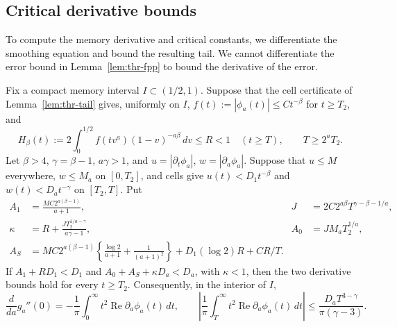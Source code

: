 \subsection{Critical derivative bounds}
\label{or:transition-unique}

To compute the memory derivative and critical constants, we
differentiate the smoothing equation and bound the resulting tail.
We cannot differentiate the error bound in Lemma~\ref{lem:thr-fpp}
to bound the derivative of the error.

\begin{lemma}\label{lem:thr-parameter-tail}
Fix a compact memory interval $I\subset(1/2,1)$. Suppose that the
cell certificate of Lemma~\ref{lem:thr-tail} gives, uniformly on $I$,
$f(t):=|\phi_a(t)|\le Ct^{-\beta}$ for $t\ge T_2$, and
\[
 H_\beta(t):=2\int_0^{1/2}f(tv^a)(1-v)^{-a\beta}\,dv\le R<1
 \quad(t\ge T),\qquad T\ge2^aT_2.
\]
Let $\beta>4$, $\gamma=\beta-1$, $a\gamma>1$, and
$u=|\partial_t\phi_a|$, $w=|\partial_a\phi_a|$.
Suppose that $u\le M$ everywhere, $w\le M_a$ on $[0,T_2]$, and
cells give $u(t)<D_1t^{-\beta}$ and $w(t)<D_at^{-\gamma}$ on $[T_2,T]$.
Put
\begin{align*}
 A_1&=\frac{MC2^{a(\beta-1)}}{a+1},&
 J&=2C2^{a\beta}T^{\gamma-\beta-1/a},\\
 \kappa&=R+\frac{JT_2^{1/a-\gamma}}{a\gamma-1},&
 A_0&=JM_aT_2^{1/a},\\
 A_S&=MC2^{a(\beta-1)}
 \left\{\frac{\log2}{a+1}+\frac1{(a+1)^2}\right\}
       +D_1(\log2)R+CR/T.
\end{align*}
If $A_1+RD_1<D_1$ and $A_0+A_S+\kappa D_a<D_a$, with
$\kappa<1$, then the two derivative bounds hold for every $t\ge T_2$.
Consequently, in the interior of $I$,
\begin{equation}\label{eq:thr-memory-derivative}
 \frac{d}{da}g_a''(0)=-\frac1\pi\int_0^\infty
 t^2\operatorname{Re}\partial_a\phi_a(t)\,dt,
 \qquad
 \left|\frac1\pi\int_T^\infty t^2
 \operatorname{Re}\partial_a\phi_a(t)\,dt\right|
 \le\frac{D_aT^{3-\gamma}}{\pi(\gamma-3)}.
\end{equation}
\end{lemma}

